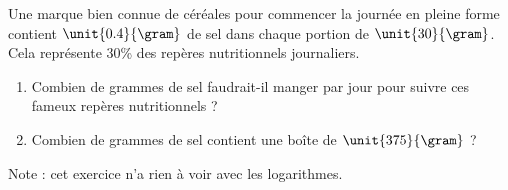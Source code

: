 
\begin{exercice}\label{exologarithme-0003}

    Une marque bien connue de céréales pour commencer la journée en pleine forme contient \( \unit{0.4}{\gram}\) de sel dans chaque portion de \( \unit{30}{\gram}\). Cela représente \( 30\)\% des repères nutritionnels journaliers.
    \begin{enumerate}
        \item
            Combien de grammes de sel faudrait-il manger par jour pour suivre ces fameux repères nutritionnels ?
        \item
            Combien de grammes de sel contient une boîte de \( \unit{375}{\gram}\) ?
    \end{enumerate}
    Note : cet exercice n'a rien à voir avec les logarithmes.

\end{exercice}
